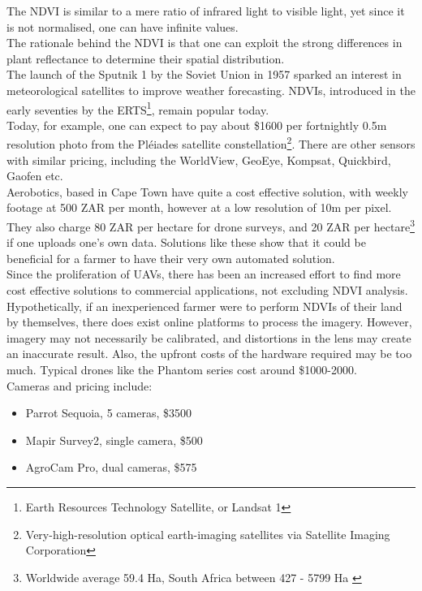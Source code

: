 The NDVI is similar to a mere ratio of infrared light to visible light, yet since it is not normalised, one can have infinite values.\\

The rationale behind the NDVI is that one can exploit the strong differences in plant reflectance to determine their spatial distribution.\\

The launch of the Sputnik 1 by the Soviet Union in 1957 sparked an interest in meteorological satellites to improve weather forecasting. NDVIs, introduced in the early seventies by the ERTS\footnote{Earth Resources Technology Satellite, or Landsat 1}, remain popular today. \\

Today, for example, one can expect to pay about \$1600 per fortnightly 0.5m resolution photo from the Pléiades satellite constellation\footnote{Very-high-resolution optical earth-imaging satellites via Satellite Imaging Corporation}. There are other sensors with similar pricing, including the WorldView, GeoEye, Kompsat, Quickbird, Gaofen etc.\\Aerobotics, based in Cape Town have quite a cost effective solution, with weekly footage at 500 ZAR per month, however at a low resolution of 10m per pixel. They also charge 80 ZAR per hectare for drone surveys, and 20 ZAR per hectare\footnote{Worldwide average 59.4 Ha\cite{farm_size}, South Africa between 427 - 5799 Ha \cite{farm_size_sa}} if one uploads one's own data. Solutions like these show that it could be beneficial for a farmer to have their very own automated solution.\\

Since the proliferation of UAVs, there has been an increased effort to find more cost effective solutions to commercial applications, not excluding NDVI analysis. Hypothetically, if an inexperienced farmer were to perform NDVIs of their land by themselves, there does exist online platforms to process the imagery. However, imagery may not necessarily be calibrated, and distortions in the lens may create an inaccurate result. Also, the upfront costs of the hardware required may be too much. Typical drones like the Phantom series cost around \$1000-2000. \\Cameras and pricing include:
\begin{itemize}
	\item Parrot Sequoia, 5 cameras, \$3500 \cite{sequoia}
	\item Mapir Survey2, single camera, \$500 \cite{mapir}
	\item AgroCam Pro, dual cameras, \$575 \cite{agrocam}
\end{itemize}

